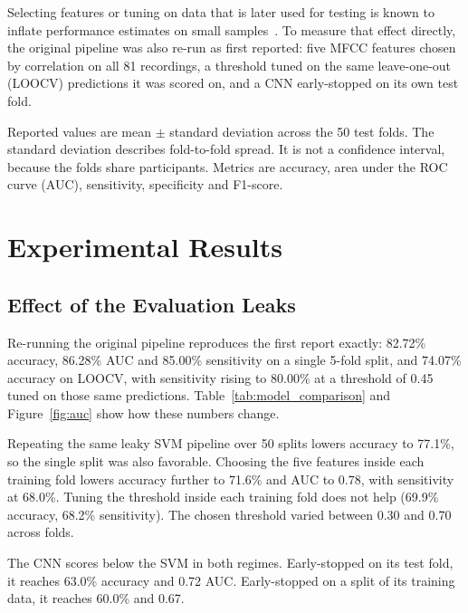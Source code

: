 \documentclass{paper}
\begin{document}
Selecting features or tuning on data that is later used for testing is known to inflate performance estimates on small samples~\cite{ambroise2002selection, varma2006bias}. To measure that effect directly, the original pipeline was also re-run as first reported: five MFCC features chosen by correlation on all 81 recordings, a threshold tuned on the same leave-one-out (LOOCV) predictions it was scored on, and a CNN early-stopped on its own test fold.

Reported values are mean $\pm$ standard deviation across the 50 test folds. The standard deviation describes fold-to-fold spread. It is not a confidence interval, because the folds share participants. Metrics are accuracy, area under the ROC curve (AUC), sensitivity, specificity and F1-score.

\section{Experimental Results}

\subsection{Effect of the Evaluation Leaks}
Re-running the original pipeline reproduces the first report exactly: 82.72\% accuracy, 86.28\% AUC and 85.00\% sensitivity on a single 5-fold split, and 74.07\% accuracy on LOOCV, with sensitivity rising to 80.00\% at a threshold of 0.45 tuned on those same predictions. Table~\ref{tab:model_comparison} and Figure~\ref{fig:auc} show how these numbers change.

Repeating the same leaky SVM pipeline over 50 splits lowers accuracy to 77.1\%, so the single split was also favorable. Choosing the five features inside each training fold lowers accuracy further to 71.6\% and AUC to 0.78, with sensitivity at 68.0\%. Tuning the threshold inside each training fold does not help (69.9\% accuracy, 68.2\% sensitivity). The chosen threshold varied between 0.30 and 0.70 across folds.

The CNN scores below the SVM in both regimes. Early-stopped on its test fold, it reaches 63.0\% accuracy and 0.72 AUC. Early-stopped on a split of its training data, it reaches 60.0\% and 0.67.
\end{document}
